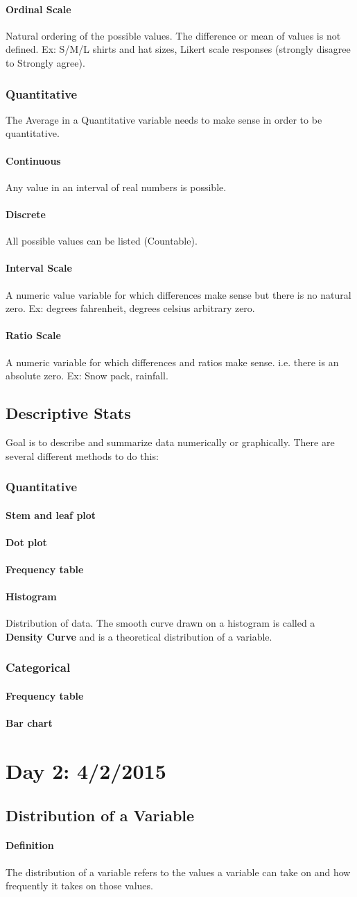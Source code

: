 \documentclass{article}
\newcommand{\p}[1]{\paragraph{#1}} %
\begin{document}
			 \p{Ordinal Scale}
			 Natural ordering of the possible values. The difference or mean of values is not
			 defined. Ex: S/M/L shirts and hat sizes, Likert scale responses (strongly disagree
			 to Strongly agree).

		\subsubsection{Quantitative}
		The Average in a Quantitative variable needs to make sense in order to be quantitative.
			\p{Continuous}
			Any value in an interval of real numbers is possible.
			
			\p{Discrete}
			All possible values can be listed (Countable).
			
			\p{Interval Scale}
			A numeric value variable for which differences make sense but there is no natural
			zero. Ex: degrees fahrenheit, degrees celsius arbitrary zero.
			
			\p{Ratio Scale}
			A numeric variable for which differences and ratios make sense. i.e. there is an
			absolute zero. Ex: Snow pack, rainfall.
			
	\subsection{Descriptive Stats}
	Goal is to describe and summarize data numerically or graphically. There are several
	different methods to do this:
		
		\subsubsection{Quantitative}
			\p{Stem and leaf plot}
			\p{Dot plot}
			\p{Frequency table}
			\p{Histogram}
			Distribution of data. The smooth curve drawn on a histogram is called a 
			\textbf{Density Curve} and is a theoretical distribution of a variable.
			
		\subsubsection{Categorical}
			\p{Frequency table}
			\p{Bar chart}

\section{Day 2:  4/2/2015}

	\subsection{Distribution of a Variable}
	\p{Definition}
	The distribution of a variable refers to the values a variable can take on and how frequently it
	takes on those values.
	
\end{document}
